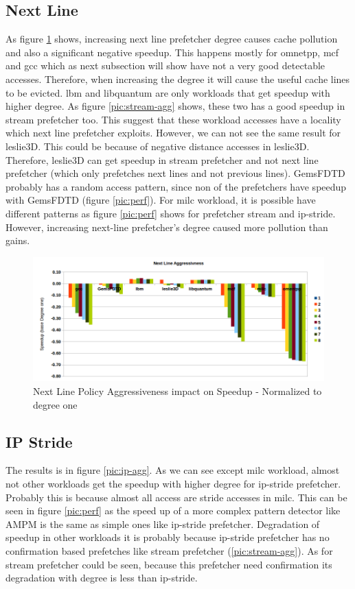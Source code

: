 \documentclass{article}
\begin{document}
\subsection{Next Line}
As figure \ref{pic:next-agg} shows, increasing next line prefetcher degree causes cache pollution and also a significant negative speedup. This happens mostly for omnetpp, mcf and gcc which as next subsection will show have not a very good detectable accesses. Therefore, when increasing the degree it will cause the useful cache lines to be evicted. lbm and libquantum are only workloads that get speedup with higher degree. As figure \ref{pic:stream-agg} shows, these two has a good speedup in stream prefetcher too. This suggest that these workload accesses have a locality which next line prefetcher exploits. However, we can not see the same result for leslie3D. This could be because of negative distance accesses in leslie3D. Therefore, leslie3D can get speedup in stream prefetcher and not next line prefetcher (which only prefetches next lines and not previous lines). GemsFDTD probably has a random access pattern, since non of the prefetchers have speedup with GemsFDTD (figure \ref{pic:perf}). For milc workload, it is possible have different patterns as figure \ref{pic:perf} shows for prefetcher stream and ip-stride. However, increasing next-line prefetcher's degree caused more pollution than gains.

\begin{figure}[!h]
  \label{pic:next-agg}
  \centering
    \includegraphics[width=1\textwidth]{next_agg.png}
    \caption{Next Line Policy Aggressiveness impact on Speedup - Normalized to degree one}
\end{figure}

\subsection{IP Stride}
The results is in figure \ref{pic:ip-agg}. As we can see except milc workload, almost not other workloads get the speedup with higher degree for ip-stride prefetcher. Probably this is because almost all access are stride accesses in milc. This can be seen in figure \ref{pic:perf} as the speed up of a more complex pattern detector like AMPM is the same as simple ones like ip-stride prefetcher. Degradation of speedup in other workloads it is probably because ip-stride prefetcher has no confirmation based prefetches like stream prefetcher (\ref{pic:stream-agg}). As for stream prefetcher could be seen, because this prefetcher need confirmation its degradation with degree is less than ip-stride. 
\end{document}

